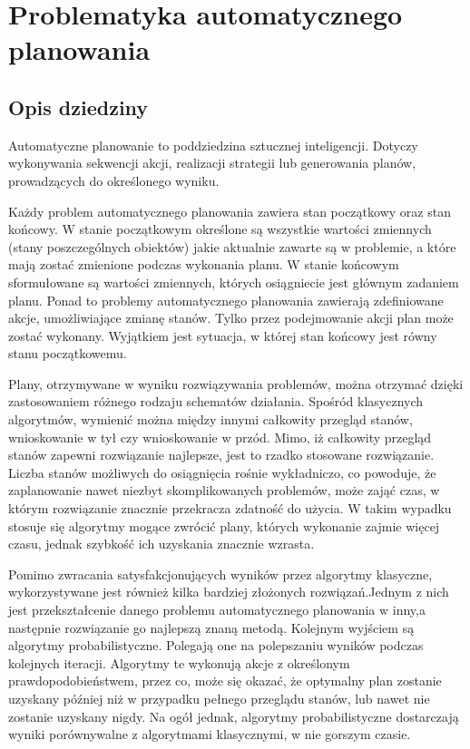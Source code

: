 \chapter{Problematyka automatycznego planowania}
 \section{Opis dziedziny}
Automatyczne planowanie to poddziedzina sztucznej inteligencji. Dotyczy wykonywania sekwencji akcji, realizacji strategii lub generowania planów, prowadzących do określonego wyniku.

Każdy problem automatycznego planowania zawiera stan początkowy oraz stan końcowy. W stanie początkowym określone są wszystkie wartości zmiennych (stany poszczególnych obiektów) jakie aktualnie zawarte są w problemie, a które mają zostać zmienione podczas wykonania planu. W stanie końcowym sformułowane są wartości zmiennych, których osiągniecie jest głównym zadaniem planu. Ponad to problemy automatycznego planowania zawierają zdefiniowane akcje, umożliwiające zmianę stanów. Tylko przez podejmowanie akcji plan może zostać wykonany. Wyjątkiem jest sytuacja, w której stan końcowy jest równy stanu początkowemu.

Plany, otrzymywane w wyniku rozwiązywania problemów, można otrzymać dzięki zastosowaniem różnego rodzaju schematów działania. Spośród klasycznych algorytmów, wymienić można między innymi całkowity przegląd stanów, wnioskowanie w tył czy wnioskowanie w przód. Mimo, iż całkowity przegląd stanów zapewni rozwiązanie najlepsze, jest to rzadko stosowane rozwiązanie. Liczba stanów możliwych do osiągnięcia rośnie wykładniczo, co powoduje, że zaplanowanie nawet niezbyt skomplikowanych problemów, może zająć czas, w którym rozwiązanie znacznie przekracza zdatność do użycia. W takim wypadku stosuje się algorytmy mogące zwrócić plany, których wykonanie zajmie więcej czasu, jednak szybkość ich uzyskania znacznie wzrasta.

Pomimo zwracania satysfakcjonujących wyników przez algorytmy klasyczne, wykorzystywane jest również kilka bardziej złożonych rozwiązań.Jednym z nich jest przekształcenie danego problemu automatycznego planowania w inny,a następnie  rozwiązanie go najlepszą znaną metodą. Kolejnym wyjściem są algorytmy probabilistyczne. Polegają one na polepszaniu wyników podczas kolejnych iteracji. Algorytmy te wykonują akcje z określonym prawdopodobieństwem, przez co, może się okazać, że optymalny plan zostanie uzyskany później niż w przypadku pełnego przeglądu stanów, lub nawet nie zostanie uzyskany nigdy. Na ogół jednak, algorytmy probabilistyczne dostarczają wyniki porównywalne z algorytmami klasycznymi, w nie gorszym czasie.


